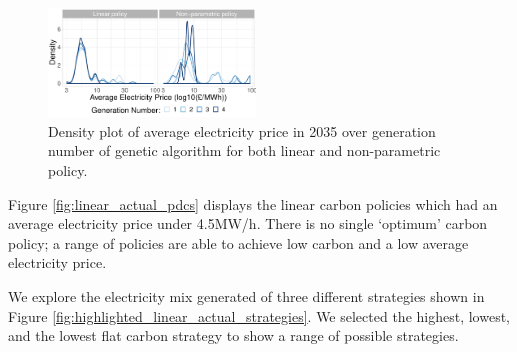 


\begin{figure}
	\centering
	\includegraphics[width=0.49\textwidth,]{Chapter6/figures/results/linear_and_free_ga_development_distribution_avg_elec_price.pdf}
	\caption{Density plot of average electricity price in 2035 over generation number of genetic algorithm for both linear and non-parametric policy.}
	\label{fig:comparison_of_distributions}
\end{figure}

Figure \ref{fig:linear_actual_pdcs} displays the linear carbon policies which had an average electricity price under \textsterling4.5MW/h. There is no single `optimum' carbon policy; a range of policies are able to achieve low carbon and a low average electricity price.


We explore the electricity mix generated of three different strategies shown in Figure \ref{fig:highlighted_linear_actual_strategies}. We selected the highest, lowest, and the lowest flat carbon strategy to show a range of possible strategies.

%





